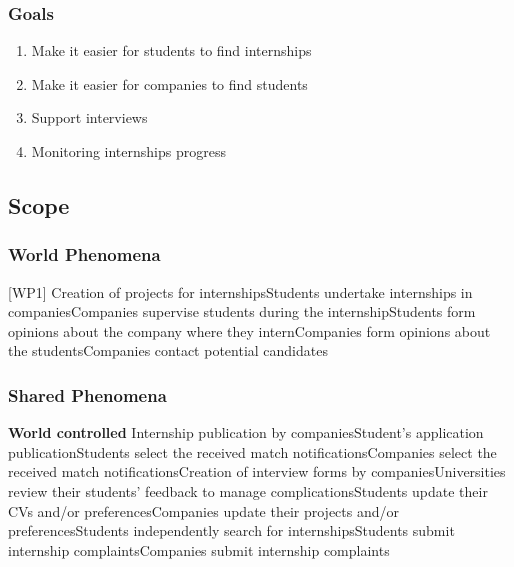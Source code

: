 \documentclass{article}
\begin{document}
\subsubsection{Goals}
\begin{enumerate}
    \item Make it easier for students to find internships
    \item Make it easier for companies to find students
    \item Support interviews 
    \item Monitoring internships progress 
\end{enumerate}

\subsection{Scope}

\subsubsection{World Phenomena}
[WP1] Creation of projects for internships\newline
[WP2] Students undertake internships in companies\newline
[WP3] Companies supervise students during the internship\newline
[WP4] Students form opinions about the company where they intern\newline
[WP5] Companies form opinions about the students\newline
[WP6] Companies contact potential candidates\newline

\subsubsection{Shared Phenomena}

\textbf{World controlled} \newline
[SWC1] Internship publication by companies\newline
[SWC2] Student's application publication\newline
[SWC3] Students select the received match notifications\newline
[SWC4] Companies select the received match notifications\newline
[SWC6] Creation of interview forms by companies\newline
[SWC7] Universities review their students' feedback to manage complications\newline
[SWC8] Students update their CVs and/or preferences\newline
[SWC9] Companies update their projects and/or preferences\newline
[SWC10] Students independently search for internships\newline
[SWC11] Students submit internship complaints\newline
[SWC12] Companies submit internship complaints\newline
\end{document}
